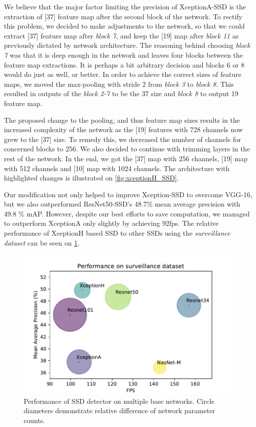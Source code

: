 We believe that the major factor limiting the precision of XceptionA-SSD is the extraction of [37] feature map after the second block of the network. To rectify this problem, we decided to make adjustments to the network, so that we could extract [37] feature map after \textit{block 7}, and keep the [19] map after \textit{block 11} as previously dictated by network architecture. The reasoning behind choosing \textit{block 7} was that it is deep enough in the network and leaves four blocks between the feature map extractions. It is perhaps a bit arbitrary decision and blocks 6 or 8 would do just as well, or better.  In order to achieve the correct sizes of feature maps, we moved the max-pooling with stride 2 from \textit{block 3} to \textit{block 8}. This resulted in outputs of the \textit{block 2-7} to be the 37 size and \textit{block 8} to output 19 feature map. 

The proposed change to the pooling, and thus feature map sizes results in the increased complexity of the network as the [19] features with 728 channels now grew to the [37] size. To remedy this, we decreased the number of channels for concerned blocks to 256. We also decided to continue with trimming layers in the rest of the network. In the end, we got the [37] map with 256 channels, [19] map with 512 channels and [10] map with 1024 channels. The architecture with highlighted changes is illustrated on \cref{fig:xceptionH_SSD}. 

Our modification not only helped to improve Xception-SSD to overcome VGG-16, but we also outperformed ResNet50-SSD's 48.7\% mean average precision with 49.8 \% mAP. However, despite our best efforts to save computation, we managed to outperform XceptionA only slightly by achieving 92fps. The relative performance of XceptionH based SSD to other SSDs using the \textit{surveillance dataset} can be seen on \cref{fig:surv_perf}.

\begin{figure}
    \centering
    \includegraphics[width=\textwidth]{img/fps_map_s}
    \caption[Performance of SSD with multiple base networks on Surveillance dataset]{Performance of SSD detector on multiple base networks. Circle diameters demonstrate relative difference of network parameter counts.} 
    \label{fig:surv_perf}
\end{figure}

